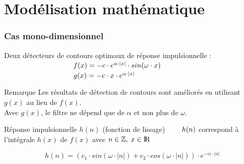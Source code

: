 \documentclass{beamer}
\begin{document}
\section{Modélisation mathématique}\label{modelisation_mathematique}

\begin{frame}
\frametitle{Cas mono-dimensionnel}

\begin{block}{Deux détecteurs de contours optimaux de réponse impulsionnelle :}
$ \hskip 9.7 em f(x) = -c \cdot e^{\alpha \cdot |x|} \cdot sin(\omega \cdot x) $ \\
$ \hskip 9.7 em g(x) = -c \cdot x \cdot e^{\alpha \cdot |x|} $
\end{block}

\begin{alertblock}{Remarque}
Les résultats de détection de contours sont améliorés en utilisant $ g(x) $ au lieu de $ f(x) $. \\
Avec $ g(x) $, le filtre ne dépend que de $ \alpha $ et non plus de $ \omega $.
\end{alertblock}

\begin{block}{Réponse impulsionnelle $ h(n) $ (fonction de lissage)}
$ \hskip 2 em h(n) $ correspond à l’intégrale $ h(x) $ de $ f(x) $ avec $ n \in \mathbb{Z}, \; x \in \rm I\!R $

\[ h(n) = (c_1 \cdot sin(\omega \cdot |n|) + c_2 \cdot cos(\omega \cdot |n|)) \cdot e^{-\alpha \cdot |n|} \]
\end{block}
\end{frame}
\end{document}
